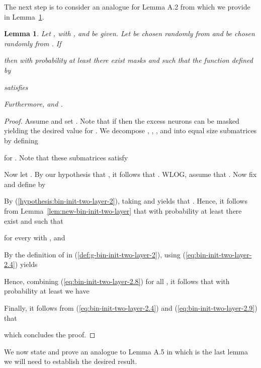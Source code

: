 \documentclass{article} \usepackage{iclr2021_conference,times}
\newtheorem{lemma}{Lemma}
\begin{document}
The next step is to consider an analogue for Lemma A.2 from \citep{malach2020proving} which we provide in Lemma~\ref{lem:bin-init-two-layer-2}.

\begin{lemma} \label{lem:bin-init-two-layer-2}
Let ,  with , and  be given. Let  be chosen randomly from  and  be chosen randomly from . If
 
then with probability at least  there exist masks  and  such that the function  defined by

satisfies

Furthermore,  and .
\end{lemma}
\begin{proof}
Assume  and set . Note that if  then the excess neurons can be masked yielding the desired value for . We decompose , , , and  into  equal size submatrices by defining

for . Note that these submatrices satisfy 


Now let . By our hypothesis that , it follows that . WLOG, assume that . Now fix  and define  by

By (\ref{hypothesis:bin-init-two-layer-2}), taking  and  yields that . Hence, it follows from Lemma~\ref{lem:new-bin-init-two-layer} that with probability at least  there exist  and  such that 

for every  with , and


By the definition of  in (\ref{def:g-bin-init-two-layer-2}), using (\ref{eq:bin-init-two-layer-2.4}) yields

Hence, combining (\ref{eq:bin-init-two-layer-2.8}) for all , it follows that with probability at least  we have

Finally, it follows from (\ref{eq:bin-init-two-layer-2.4}) and (\ref{eq:bin-init-two-layer-2.9}) that

which concludes the proof.
\end{proof}

We now state and prove an analogue to Lemma A.5 in \citep{malach2020proving} which is the last lemma we will need to establish the desired result.
\end{document}
